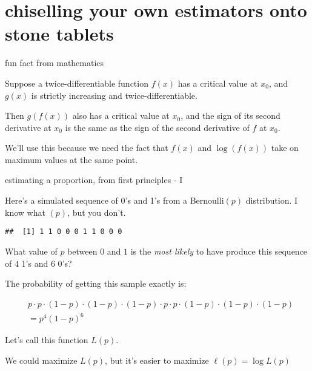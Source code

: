 \documentclass[ignorenonframetext,aspectratio=169]{beamer}
\begin{document}
\section{chiselling your own estimators onto stone
tablets}\label{chiselling-your-own-estimators-onto-stone-tablets}

\begin{frame}{fun fact from mathematics}

Suppose a twice-differentiable function \(f(x)\) has a critical value at
\(x_0\), and \(g(x)\) is strictly increasing and twice-differentiable.

Then \(g(f(x))\) also has a critical value at \(x_0\), and the sign of
its second derivative at \(x_0\) is the same as the sign of the second
derivative of \(f\) at \(x_0\).

\pause We'll use this because we need the fact that \(f(x)\) and
\(\log(f(x))\) take on maximum values at the same point.

\end{frame}

\begin{frame}[fragile]{estimating a proportion, from first principles -
I}

Here's a simulated sequence of 0's and 1's from a Bernoulli\((p)\)
distribution. I know what \((p)\), but you don't.

\begin{verbatim}
##  [1] 1 1 0 0 0 1 1 0 0 0
\end{verbatim}

What value of \(p\) between \(0\) and \(1\) is the \textit{most likely}
to have produce this sequence of \(4\) 1's and \(6\) 0's?

\pause The probability of getting this sample exactly is:

\begin{align*}
& p\cdot p\cdot (1-p)\cdot (1-p)\cdot (1-p)\cdot p\cdot p\cdot (1-p)\cdot (1-p)\cdot (1-p) \\
&= p^4(1-p)^6
\end{align*}

Let's call this function \(L(p)\).

\pause We could maximize \(L(p)\), but it's easier to maximize
\(\ell(p) = \log{L(p)}\)

\end{frame}
\end{document}
